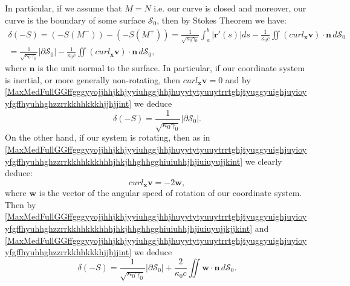 \documentclass{article}
\theoremstyle{definition}
\theoremstyle{remark}
\renewcommand{\vec}[1]{\mathbf{#1}}
\newcommand{\er}{\eqref}
\newcommand{\er}{\eqref}
\begin{document}
In particular, if we assume that $M=N$ i.e. our curve is closed and
moreover, our curve is the boundary of some surface $\mathcal{S}_0$,
then by Stokes Theorem we have:
\begin{multline}\label{MaxMedFullGGffgggyyojjhhjkhjyyiuhggjhhjhuyytytyuuytrrtghjtyuggyuighjuyioyyfgffhyuhhghzzrrkkhhkkkhjjhjjint}
\delta(-S)=\left(-S(M^-)\right)-
\left(-S(M^+)\right)=\frac{1}{\sqrt{\kappa_0\gamma_0}}\int_a^b
\left|\vec r'(s)\right|ds-\frac{1}{\kappa_0 c}\iint \left(curl_{\vec
x}\vec v\right)\cdot\vec n
\,d\mathcal{S}_0\\=\frac{1}{\sqrt{\kappa_0\gamma_0}}\left|\partial
\mathcal{S}_0\right|-\frac{1}{\kappa_0 c}\iint \left(curl_{\vec
x}\vec v\right)\cdot\vec n \,d\mathcal{S}_0,
\end{multline}
where $\vec n$ is the unit normal to the surface.
In particular, if our coordinate system is inertial, or more
generally non-rotating, then $curl_{\vec x}\vec v=0$ and by
\er{MaxMedFullGGffgggyyojjhhjkhjyyiuhggjhhjhuyytytyuuytrrtghjtyuggyuighjuyioyyfgffhyuhhghzzrrkkhhkkkhjjhjjint}
we deduce
\begin{equation}\label{MaxMedFullGGffgggyyojjhhjkhjyyiuhggjhhjhuyytytyuuytrrtghjtyuggyuighjuyioyyfgffhyuhhghzzrrkkhhkkkhjjhjjhjhhjjhjjhint}
\delta(-S)=\frac{1}{\sqrt{\kappa_0\gamma_0}}\left|\partial
\mathcal{S}_0\right|.
\end{equation}
On the other hand, if our system is rotating, then as in
\er{MaxMedFullGGffgggyyojjhhjkhjyyiuhggjhhjhuyytytyuuytrrtghjtyuggyuighjuyioyyfgffhyuhhghzzrrkkhhkkkhhhjhkjhhghhgghiuiuhhjhjiuiuyujjkint}
we clearly deduce:
\begin{equation}\label{MaxMedFullGGffgggyyojjhhjkhjyyiuhggjhhjhuyytytyuuytrrtghjtyuggyuighjuyioyyfgffhyuhhghzzrrkkhhkkkhhhjhkjhhghhgghiuiuhhjhjiuiuyujjkjjkint}
curl_{\vec x}\vec v=-2\vec w,
\end{equation}
where $\vec w$ is the vector of the angular speed of rotation of our
coordinate system. Then by
\er{MaxMedFullGGffgggyyojjhhjkhjyyiuhggjhhjhuyytytyuuytrrtghjtyuggyuighjuyioyyfgffhyuhhghzzrrkkhhkkkhhhjhkjhhghhgghiuiuhhjhjiuiuyujjkjjkint}
and
\er{MaxMedFullGGffgggyyojjhhjkhjyyiuhggjhhjhuyytytyuuytrrtghjtyuggyuighjuyioyyfgffhyuhhghzzrrkkhhkkkhjjhjjint}
we deduce
\begin{equation}\label{MaxMedFullGGffgggyyojjhhjkhjyyiuhggjhhjhuyytytyuuytrrtghjtyuggyuighjuyioyyfgffhyuhhghzzrrkkhhkkkhjjhjjjjkint}
\delta(-S)=\frac{1}{\sqrt{\kappa_0\gamma_0}}\left|\partial
\mathcal{S}_0\right|+\frac{2}{\kappa_0 c}\iint \vec w\cdot\vec n
\,d\mathcal{S}_0.
\end{equation}
\end{document}
